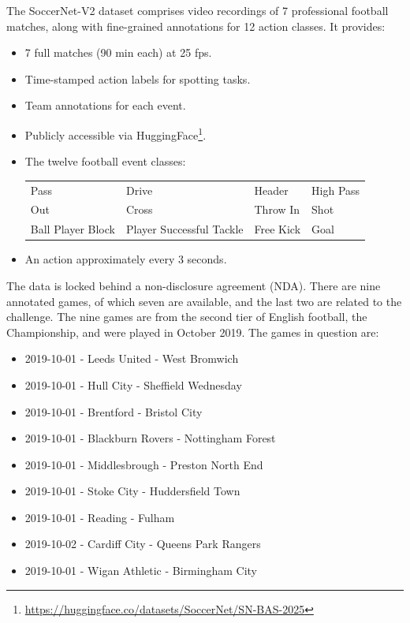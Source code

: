 The SoccerNet-V2 dataset \cite{deliege_soccernet-v2_dataset_2021} comprises video recordings of 7 professional football matches, along with fine-grained annotations for 12 action classes. It provides:
\begin{itemize}
    \item 7 full matches (90 min each) at 25 fps.
    \item Time-stamped action labels for spotting tasks.
    \item Team annotations for each event.
    \item Publicly accessible via HuggingFace\footnote{\url{https://huggingface.co/datasets/SoccerNet/SN-BAS-2025}}.
    \item The twelve football event classes:
        \begin{center}
            \begin{tabular}{llll}
                Pass & Drive & Header & High Pass \\
                Out & Cross & Throw In & Shot \\
                Ball Player Block & Player Successful Tackle & Free Kick & Goal
            \end{tabular}
        \end{center}
    \item An action approximately every 3 seconds. 
\end{itemize}

The data is locked behind a non-disclosure agreement (NDA). There are nine annotated games, of which seven are available, and the last two are related to the challenge. The nine games are from the second tier of English football, the Championship, and were played in October 2019. The games in question are: 

\begin{itemize}
    \item 2019-10-01 - Leeds United - West Bromwich
    \item 2019-10-01 - Hull City - Sheffield Wednesday
    \item 2019-10-01 - Brentford - Bristol City
    \item 2019-10-01 - Blackburn Rovers - Nottingham Forest
    \item 2019-10-01 - Middlesbrough - Preston North End
    \item 2019-10-01 - Stoke City - Huddersfield Town
    \item 2019-10-01 - Reading - Fulham
    \item 2019-10-02 - Cardiff City - Queens Park Rangers
    \item 2019-10-01 - Wigan Athletic - Birmingham City
\end{itemize}

